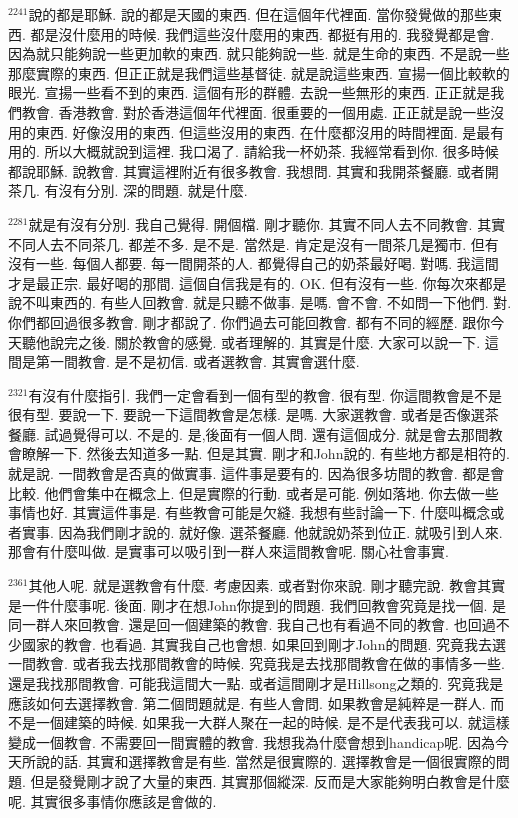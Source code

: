 \documentclass{book}
\begin{document}
$^{2241}$說的都是耶穌.
說的都是天國的東西.
但在這個年代裡面.
當你發覺做的那些東西.
都是沒什麼用的時候.
我們這些沒什麼用的東西.
都挺有用的.
我發覺都是會.
因為就只能夠說一些更加軟的東西.
就只能夠說一些.
就是生命的東西.
不是說一些那麼實際的東西.
但正正就是我們這些基督徒.
就是說這些東西.
宣揚一個比較軟的眼光.
宣揚一些看不到的東西.
這個有形的群體.
去說一些無形的東西.
正正就是我們教會.
香港教會.
對於香港這個年代裡面.
很重要的一個用處.
正正就是說一些沒用的東西.
好像沒用的東西.
但這些沒用的東西.
在什麼都沒用的時間裡面.
是最有用的.
所以大概就說到這裡.
我口渴了.
請給我一杯奶茶.
我經常看到你.
很多時候都說耶穌.
說教會.
其實這裡附近有很多教會.
我想問.
其實和我開茶餐廳.
或者開茶几.
有沒有分別.
深的問題.
就是什麼.

$^{2281}$就是有沒有分別.
我自己覺得.
開個檔.
剛才聽你.
其實不同人去不同教會.
其實不同人去不同茶几.
都差不多.
是不是.
當然是.
肯定是沒有一間茶几是獨市.
但有沒有一些.
每個人都要.
每一間開茶的人.
都覺得自己的奶茶最好喝.
對嗎.
我這間才是最正宗.
最好喝的那間.
這個自信我是有的.
OK.
但有沒有一些.
你每次來都是說不叫東西的.
有些人回教會.
就是只聽不做事.
是嗎.
會不會.
不如問一下他們.
對.
你們都回過很多教會.
剛才都說了.
你們過去可能回教會.
都有不同的經歷.
跟你今天聽他說完之後.
關於教會的感覺.
或者理解的.
其實是什麼.
大家可以說一下.
這間是第一間教會.
是不是初信.
或者選教會.
其實會選什麼.

$^{2321}$有沒有什麼指引.
我們一定會看到一個有型的教會.
很有型.
你這間教會是不是很有型.
要說一下.
要說一下這間教會是怎樣.
是嗎.
大家選教會.
或者是否像選茶餐廳.
試過覺得可以.
不是的.
是,後面有一個人問.
還有這個成分.
就是會去那間教會瞭解一下.
然後去知道多一點.
但是其實.
剛才和John說的.
有些地方都是相符的.
就是說.
一間教會是否真的做實事.
這件事是要有的.
因為很多坊間的教會.
都是會比較.
他們會集中在概念上.
但是實際的行動.
或者是可能.
例如落地.
你去做一些事情也好.
其實這件事是.
有些教會可能是欠縫.
我想有些討論一下.
什麼叫概念或者實事.
因為我們剛才說的.
就好像.
選茶餐廳.
他就說奶茶到位正.
就吸引到人來.
那會有什麼叫做.
是實事可以吸引到一群人來這間教會呢.
關心社會事實.

$^{2361}$其他人呢.
就是選教會有什麼.
考慮因素.
或者對你來說.
剛才聽完說.
教會其實是一件什麼事呢.
後面.
剛才在想John你提到的問題.
我們回教會究竟是找一個.
是同一群人來回教會.
還是回一個建築的教會.
我自己也有看過不同的教會.
也回過不少國家的教會.
也看過.
其實我自己也會想.
如果回到剛才John的問題.
究竟我去選一間教會.
或者我去找那間教會的時候.
究竟我是去找那間教會在做的事情多一些.
還是我找那間教會.
可能我這間大一點.
或者這間剛才是Hillsong之類的.
究竟我是應該如何去選擇教會.
第二個問題就是.
有些人會問.
如果教會是純粹是一群人.
而不是一個建築的時候.
如果我一大群人聚在一起的時候.
是不是代表我可以.
就這樣變成一個教會.
不需要回一間實體的教會.
我想我為什麼會想到handicap呢.
因為今天所說的話.
其實和選擇教會是有些.
當然是很實際的.
選擇教會是一個很實際的問題.
但是發覺剛才說了大量的東西.
其實那個縱深.
反而是大家能夠明白教會是什麼呢.
其實很多事情你應該是會做的.
\end{document}
